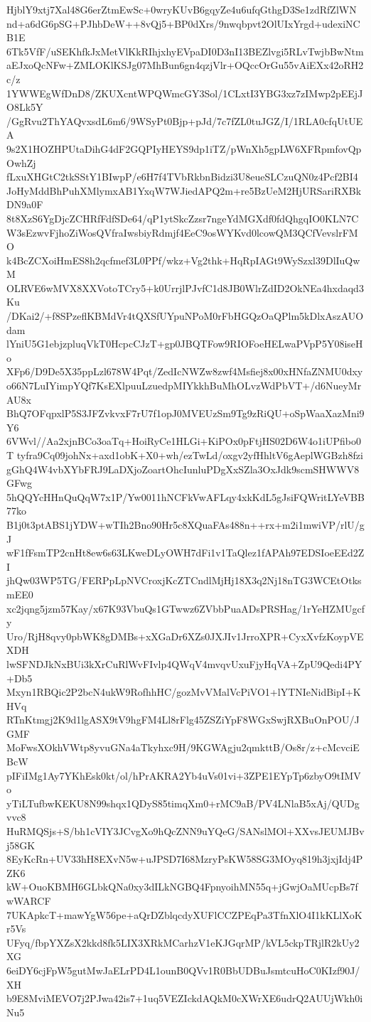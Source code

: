 HjblY9xtj7Xal48G6erZtmEwSc+0wryKUvB6gqyZe4u6ufqGthgD3Se1zdRfZlWN
nd+a6dG6pSG+PJhbDeW++8vQj5+BP0dXrs/9nwqbpvt2OlUIxYrgd+udexiNCB1E
6Tk5VfF/uSEKhfkJxMetVlKkRIhjxhyEVpaDI0D3nI13BEZlvgi5RLvTwjbBwNtm
aEJxoQcNFw+ZMLOKlKSJg07MhBun6gn4qzjVlr+OQccOrGu55vAiEXx42oRH2c/z
1YWWEgWfDnD8/ZKUXcntWPQWmcGY3Sol/1CLxtI3YBG3xz7zIMwp2pEEjJO8Lk5Y
/GgRvu2ThYAQvxsdL6m6/9WSyPt0Bjp+pJd/7c7fZL0tuJGZ/I/1RLA0cfqUtUEA
9s2X1HOZHPUtaDihG4dF2GQPIyHEYS9dp1iTZ/pWnXh5gpLW6XFRpmfovQpOwhZj
fLxuXHGtC2tkSStY1BIwpP/e6H7f4TVbRkbnBidzi3U8eueSLCzuQN0z4Pcf2BI4
JoHyMddBhPuhXMlymxAB1YxqW7WJiedAPQ2m+re5BzUeM2HjURSariRXBkDN9a0F
8t8XzS6YgDjcZCHRfFdfSDe64/qP1ytSkcZzsr7ngeYdMGXdf0fdQhgqIO0KLN7C
W3sEzwvFjhoZiWosQVfraIwsbiyRdmjf4EeC9osWYKvd0lcowQM3QCfVevslrFMO
k4BcZCXoiHmES8h2qcfmef3L0PPf/wkz+Vg2thk+HqRpIAGt9WySzxl39DlIuQwM
OLRVE6wMVX8XXVotoTCry5+k0UrrjlPJvfC1d8JB0WlrZdID2OkNEa4hxdaqd3Ku
/DKai2/+f8SPzeflKBMdVr4tQXSfUYpuNPoM0rFbHGQzOaQPlm5kDlxAszAUOdam
lYniU5G1ebjzpluqVkT0HcpcCJzT+gp0JBQTFow9RIOFoeHELwaPVpP5Y08iseHo
XFp6/D9De5X35ppLzl678W4Pqt/ZedIcNWZw8zwf4Msfiej8x00xHNfaZNMU0dxy
o66N7LuIYimpYQf7KsEXlpuuLzuedpMIYkkhBuMhOLvzWdPbVT+/d6NueyMrAU8x
BhQ7OFqpxlP5S3JFZvkvxF7rU7f1opJ0MVEUzSm9Tg9zRiQU+oSpWaaXazMni9Y6
6VWvl//Aa2xjnBCo3oaTq+HoiRyCe1HLGi+KiPOx0pFtjHS02D6W4o1iUPfibo0T
tyfra9Cq09johNx+axd1obK+X0+wh/ezTwLd/oxgv2yfHhltV6gAeplWGBzh8fzi
gGhQ4W4vbXYbFRJ9LaDXjoZoartOhcIunluPDgXxSZla3OxJdk9scmSHWWV8GFwg
5hQQYcHHnQuQqW7x1P/Yw0011hNCFkVwAFLqy4xkKdL5gJsiFQWritLYeVBB77ko
B1j0t3ptABS1jYDW+wTIh2Bno90Hr5c8XQuaFAs488n++rx+m2i1mwiVP/rlU/gJ
wF1fFsmTP2cnHt8ew6s63LKweDLyOWH7dFi1v1TaQlez1fAPAh97EDSIoeEEd2ZI
jhQw03WP5TG/FERPpLpNVCroxjKcZTCndlMjHj18X3q2Nj18nTG3WCEtOtksmEE0
xc2jqng5jzm57Kay/x67K93VbuQs1GTwwz6ZVbbPuaADsPRSHag/1rYeHZMUgcfy
Uro/RjH8qvy0pbWK8gDMBs+xXGaDr6XZs0JXJIv1JrroXPR+CyxXvfzKoypVEXDH
lwSFNDJkNxBUi3kXrCuRlWvFIvlp4QWqV4mvqvUxuFjyHqVA+ZpU9Qedi4PY+Db5
Mxyn1RBQic2P2bcN4ukW9RofhhHC/gozMvVMalVcPiVO1+lYTNIeNidBipI+KHVq
RTnKtmgj2K9d1lgASX9tV9hgFM4Ll8rFlg45ZSZiYpF8WGxSwjRXBuOnPOU/JGMF
MoFwsXOkhVWtp8yvuGNa4aTkyhxc9H/9KGWAgju2qmkttB/Os8r/z+cMcvciEBcW
pIFiIMg1Ay7YKhEsk0kt/ol/hPrAKRA2Yb4uVs01vi+3ZPE1EYpTp6zbyO9tIMVo
yTiLTufbwKEKU8N99shqx1QDyS85timqXm0+rMC9aB/PV4LNlaB5xAj/QUDgvvc8
HuRMQSjs+S/bh1cVIY3JCvgXo9hQcZNN9uYQeG/SANslMOl+XXvsJEUMJBvj58GK
8EyKcRn+UV33hH8EXvN5w+uJPSD7I68MzryPsKW58SG3MOyq819h3jxjIdj4PZK6
kW+OuoKBMH6GLbkQNa0xy3dILkNGBQ4FpnyoihMN55q+jGwjOaMUcpBs7fwWARCF
7UKApkcT+mawYgW56pe+aQrDZblqcdyXUFlCCZPEqPa3TfnXlO4I1kKLlXoKr5Vs
UFyq/fbpYXZsX2kkd8fk5LIX3XRkMCarhzV1eKJGqrMP/kVL5ckpTRjlR2kUy2XG
6eiDY6cjFpW5gutMwJaELrPD4L1ounB0QVv1R0BbUDBuJsmtcuHoC0KIzf90J/XH
b9E8MviMEVO7j2PJwa42is7+1uq5VEZIckdAQkM0cXWrXE6udrQ2AUUjWkh0iNu5
